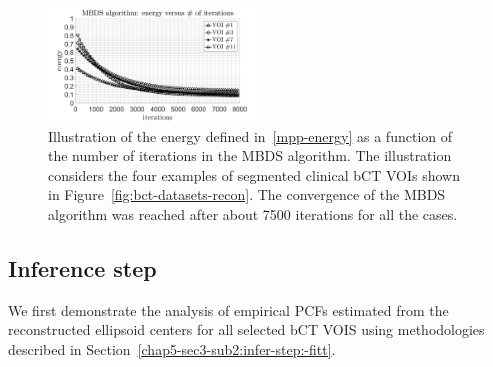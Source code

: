 \documentclass[journal]{IEEEtran}
\begin{document}
\begin{figure}[!htb]
  \centering
  \includegraphics[width=0.5\textwidth]
  {figure/convergence_mbds}
  \caption{Illustration of the energy defined in~\eqref{mpp-energy} as
    a function of the number of iterations in the MBDS algorithm. The
    illustration considers the four examples of segmented clinical bCT
    VOIs shown in Figure~\ref{fig:bct-datasets-recon}. The convergence
    of the MBDS algorithm was reached after about 7500 iterations for
    all the cases.}
  \label{fig:conv-mbds}
\end{figure}

\subsection{Inference step}
\label{chap4-sec4-sub2:result-infer-step}

We first demonstrate the analysis of empirical PCFs estimated from the
reconstructed ellipsoid centers for all selected bCT VOIS using
methodologies described in
Section~\ref{chap5-sec3-sub2:infer-step:-fitt}.
\end{document}
